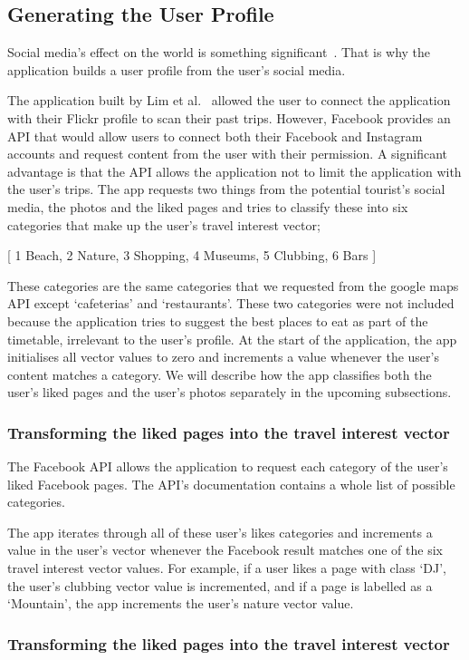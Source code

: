 
\subsection{Generating the User Profile}
Social media's effect on the world is something significant~\cite{Miller2016}.
That is why the application builds a user profile from
the user's social media. 

The application built by Lim et al.~\cite{Lim2018a} allowed the user to connect
the application with their Flickr profile to scan their past trips. However,
Facebook provides an API that would allow users to connect both their Facebook
and Instagram accounts and request content from the user with their permission.
A significant advantage is that the API allows the application not to limit the
application with the user's trips. The app requests two things from the
potential tourist's social media, the photos and the liked pages and tries to
classify these into six categories that make up the user's travel interest
vector; 

[   
1 Beach,
2 Nature,
3 Shopping,
4 Museums,
5 Clubbing,
6 Bars ]


These categories are the same categories that we requested from the google maps
API except `cafeterias' and `restaurants'. These two categories were not
included because the application tries to suggest the best places to eat as
part of the timetable, irrelevant to the user's profile. At the start of the
application, the app initialises all vector values to zero and increments a
value whenever the user's content matches a category. We will describe how the
app classifies both the user's liked pages and the user's photos separately in
the upcoming subsections.

\subsubsection{Transforming the liked pages into the travel interest vector}
The Facebook API allows the application to request each category of the user's
liked Facebook pages. The API's documentation contains a whole list of possible
categories. 

The app iterates through
all of these user's likes categories and increments a value in the user's
vector whenever the Facebook result matches one of the six travel interest
vector values. For example, if a user likes a page with class `DJ', the user's
clubbing vector value is incremented, and if a page is labelled as a
`Mountain', the app increments the user's nature vector value.

\subsubsection{Transforming the liked pages into the travel interest vector}
